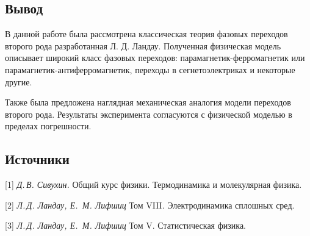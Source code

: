 \documentclass[a4paper, 12pt]{article}
\begin{document}
\subsection*{Вывод}
 
В данной работе была рассмотрена классическая теория фазовых переходов второго рода разработанная Л. Д. Ландау. Полученная физическая модель описывает широкий класс фазовых переходов:  парамагнетик-ферромагнетик или парамагнетик-антиферромагнетик, переходы в сегнетоэлектриках и некоторые другие.

Также была предложена наглядная механическая аналогия модели переходов второго рода. Результаты эксперимента согласуются с физической моделью в пределах погрешности.


\subsection*{Источники}

[1] \textit{Д.\,В. Сивухин.} Общий курс физики. Термодинамика и молекулярная физика.

\vspace{-.7\parskip}
[2] \textit{Л.\,Д. Ландау, Е.\, М. Лифшиц} Том VIII. Электродинамика сплошных сред.

\vspace{-.7\parskip}
[3] \textit{Л.\,Д. Ландау, Е.\, М. Лифшиц} Том V. Статистическая физика.
\end{document}
